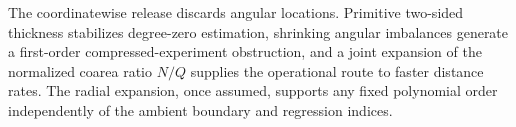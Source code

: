 The coordinatewise release discards angular locations.  Primitive two-sided thickness stabilizes degree-zero estimation, shrinking angular imbalances generate a first-order compressed-experiment obstruction, and a joint expansion of the normalized coarea ratio \(N/Q\) supplies the operational route to faster distance rates.  The radial expansion, once assumed, supports any fixed polynomial order independently of the ambient boundary and regression indices.